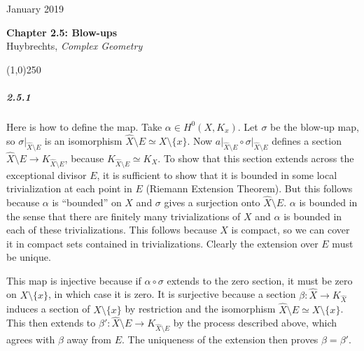 \documentclass[10pt,letter]{article}
\begin{document}
\noindent 
January 2019
\begin{center}
\textbf{Chapter 2.5: Blow-ups}\\ Huybrechts, \textit{Complex Geometry}

\line(1,0){250}
\end{center}

\subparagraph{2.5.1} Here is how to define the map. Take $\alpha \in H^0(X,K_x)$. Let $\sigma$ be the blow-up map, so $\sigma\vert_{\hat{X}\setminus E}$ is an isomorphism $\hat{X}\setminus E \simeq X \setminus \lbrace x \rbrace$. Now $ a\vert_{\hat{X}\setminus E} \circ \sigma\vert_{\hat{X}\setminus E}$ defines a section $\hat{X}\setminus E \rightarrow K_{\hat{X}\setminus E}$, because $K_{\hat{X}\setminus E} \simeq K_X$. To show that this section extends across the exceptional divisor $E$, it is sufficient to show that it is bounded in some local trivialization at each point in $E$ (Riemann Extension Theorem).   But this follows because $\alpha$ is ``bounded'' on $X$ and $\sigma$ gives a surjection onto $\hat{X} \setminus E$. $\alpha$ is bounded in the sense that there are finitely many trivializations of $X$ and $\alpha$ is bounded in each of these trivializations. This follows because $X$ is compact, so we can cover it in compact sets contained in trivializations. Clearly the extension over $E$ must be unique. 

This map is injective because if $\alpha \circ \sigma$ extends to the zero section, it must be zero on $X \setminus \lbrace x \rbrace$, in which case it is zero. It is surjective because a section $\beta: \hat{X} \rightarrow K_{\hat{X}}$ induces a section of $X \setminus \lbrace x \rbrace$ by restriction and the isomorphism $\hat{X}\setminus E \simeq X \setminus \lbrace x \rbrace$. This then extends to $\beta': \hat{X}\setminus E \rightarrow K_{\hat{X}\setminus E}$ by the process described above, which agrees with $\beta$ away from $E$. The uniqueness of the extension then proves $\beta = \beta'$. 


\end{document}
